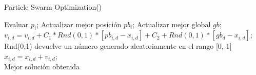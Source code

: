 \begin{algorithm}[!ht]
  \caption{Particle Swarm Optimization(\mbox{})}
  \label{pseu:pso}
  \begin{algorithmic}[1]
        \STATE Evaluar $ p_{i} $;
        \STATE Actualizar mejor posición $pb_{i}$;
        \STATE Actualizar mejor global $gb$;
      \ENDFOR
       \STATE $ v_{i,d} = v_{i,d} + C_{1} * Rnd(0,1) * [pb_{i,d} - x_{i,d}] + C_{2} + Rnd(0,1) * [gb_{d} - x_{i,d}] $;\\ Rnd(0,1) devuelve un número generado aleatoriamente en el rango [0, 1]
            $ x_{i,d} = x_{i,d} + v_{i,d}$; \\
       \ENDFOR
      \ENDFOR
    \ENDWHILE
    \RETURN Mejor solución obtenida
  \end{algorithmic}
\end{algorithm}
